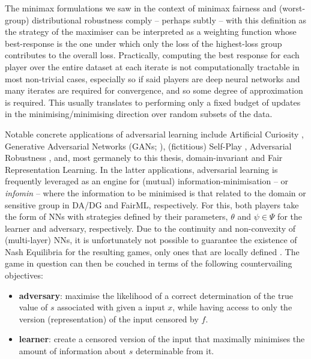 %
The minimax formulations we saw in the context of minimax fairness and (worst-group) distributional
robustness comply -- perhaps subtly -- with this definition as the strategy of the maximiser can be
interpreted as a weighting function whose best-response is the one under which only the loss of the
highest-loss group contributes to the overall loss. 
%
Practically, computing the best response for each player over the entire dataset at each iterate is
not computationally tractable in most non-trivial cases, especially so if said players are deep
neural networks and many iterates are required for convergence, and so some degree of approximation
is required.
%
This usually translates to performing only a fixed budget of updates in the minimising/minimising
direction over random subsets of the data.

Notable concrete applications of adversarial learning include Artificial Curiosity
\citep{schmidhuber1992learning}, Generative Adversarial Networks (GANs;
\cite{goodfellow14generative}), (fictitious) Self-Play \citep{silver2018general}, Adversarial
Robustness \citep{szegedy2013intriguing}, and, most germanely to this thesis, domain-invariant
\citep{ganin2016domain, zhao2019learning} and Fair \citep{edwards2015censoring, madras2018learning}
Representation Learning.
%
In the latter applications, adversarial learning is frequently leveraged as an engine for
(mutual) information-minimisation -- or \emph{infomin} -- where the information to be minimised is that
related to the domain or sensitive group in DA/DG and FairML, respectively.
%
For this, both players take the form of NNs with strategies defined by their parameters, \(\theta\)
and \(\psi \in \Psi\) for the learner and adversary, respectively. 
%
Due to the continuity and non-convexity of (multi-layer) NNs, it is unfortunately not possible to
guarantee the existence of Nash Equilibria for the resulting games, only ones that are locally
defined \citep{unterthiner2018coulomb}.
%
The game in question can then be couched in terms of the following countervailing objectives:
%
\begin{itemize}
  \item \textbf{adversary}: maximise the likelihood of a correct determination of the true value of
    \(s\) associated with given a input \(x\), while having access to only the version
    (representation) of the input censored by \(f\).
  \item \textbf{learner}: create a censored version of the input that maximally minimises the
    amount of information about \(s\) determinable from it. 
\end{itemize}
